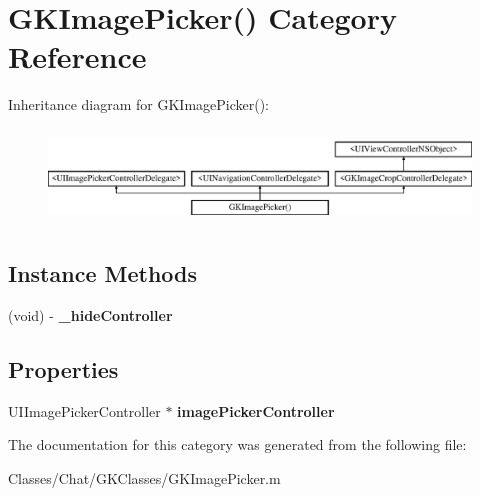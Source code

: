 \hypertarget{category_g_k_image_picker_07_08}{}\section{G\+K\+Image\+Picker() Category Reference}
\label{category_g_k_image_picker_07_08}
Inheritance diagram for G\+K\+Image\+Picker()\+:\begin{figure}[H]
\begin{center}
\leavevmode
\includegraphics[height=2.545455cm]{category_g_k_image_picker_07_08}
\end{center}
\end{figure}
\subsection*{Instance Methods}
\begin{DoxyCompactItemize}
\item 
\hypertarget{category_g_k_image_picker_07_08_aeb1a1235241df74e8f7dca752a88869d}{}(void) -\/ {\bfseries \+\_\+hide\+Controller}\label{category_g_k_image_picker_07_08_aeb1a1235241df74e8f7dca752a88869d}

\end{DoxyCompactItemize}
\subsection*{Properties}
\begin{DoxyCompactItemize}
\item 
\hypertarget{category_g_k_image_picker_07_08_aba0a32d538e177e5e9bd0c821e218d65}{}U\+I\+Image\+Picker\+Controller $\ast$ {\bfseries image\+Picker\+Controller}\label{category_g_k_image_picker_07_08_aba0a32d538e177e5e9bd0c821e218d65}

\end{DoxyCompactItemize}


The documentation for this category was generated from the following file\+:\begin{DoxyCompactItemize}
\item 
Classes/\+Chat/\+G\+K\+Classes/G\+K\+Image\+Picker.\+m\end{DoxyCompactItemize}
